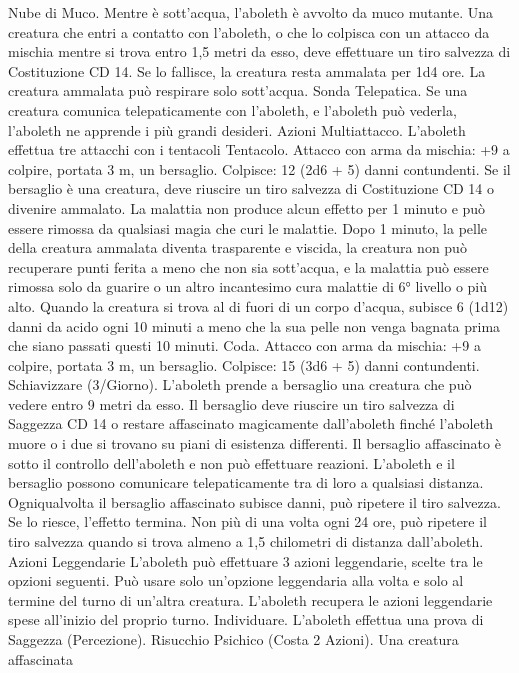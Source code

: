 \begin{multicols}{2}
Nube di Muco. Mentre è sott’acqua, l’aboleth è avvolto da muco
mutante. Una creatura che entri a contatto con l’aboleth, o che lo
colpisca con un attacco da mischia mentre si trova entro 1,5
metri da esso, deve effettuare un tiro salvezza di Costituzione
CD 14. Se lo fallisce, la creatura resta ammalata per 1d4 ore. La
creatura ammalata può respirare solo sott’acqua.
Sonda Telepatica. Se una creatura comunica telepaticamente con
l’aboleth, e l’aboleth può vederla, l’aboleth ne apprende i più
grandi desideri.
Azioni
Multiattacco. L’aboleth effettua tre attacchi con i tentacoli
Tentacolo. Attacco con arma da mischia: +9 a colpire, portata 3
m, un bersaglio.
Colpisce: 12 (2d6 + 5) danni contundenti. Se il bersaglio è una
creatura, deve riuscire un tiro salvezza di Costituzione CD 14 o
divenire ammalato. La malattia non produce alcun effetto per 1
minuto e può essere rimossa da qualsiasi magia che curi le
malattie. Dopo 1 minuto, la pelle della creatura ammalata diventa
trasparente e viscida, la creatura non può recuperare punti ferita a
meno che non sia sott’acqua, e la malattia può essere rimossa
solo da guarire o un altro incantesimo cura malattie di 6° livello
o più alto. Quando la creatura si trova al di fuori di un corpo
d’acqua, subisce 6 (1d12) danni da acido ogni 10 minuti a meno
che la sua pelle non venga bagnata prima che siano passati questi
10 minuti.
Coda. Attacco con arma da mischia: +9 a colpire, portata 3 m,
un bersaglio.
Colpisce: 15 (3d6 + 5) danni contundenti.
Schiavizzare (3/Giorno). L’aboleth prende a bersaglio una
creatura che può vedere entro 9 metri da esso. Il bersaglio deve
riuscire un tiro salvezza di Saggezza CD 14 o restare affascinato
magicamente dall’aboleth finché l’aboleth muore o i due si
trovano su piani di esistenza differenti. Il bersaglio affascinato è
sotto il controllo dell’aboleth e non può effettuare reazioni.
L’aboleth e il bersaglio possono comunicare telepaticamente tra
di loro a qualsiasi distanza.
Ogniqualvolta il bersaglio affascinato subisce danni, può ripetere
il tiro salvezza. Se lo riesce, l’effetto termina. Non più di una
volta ogni 24 ore, può ripetere il tiro salvezza quando si trova
almeno a 1,5 chilometri di distanza dall’aboleth.
Azioni Leggendarie
L’aboleth può effettuare 3 azioni leggendarie, scelte tra le
opzioni seguenti. Può usare solo un’opzione leggendaria alla
volta e solo al termine del turno di un’altra creatura. L’aboleth
recupera le azioni leggendarie spese all’inizio del proprio turno.
Individuare. L’aboleth effettua una prova di Saggezza (Percezione).
Risucchio Psichico (Costa 2 Azioni). Una creatura affascinata

\end{multicols}
